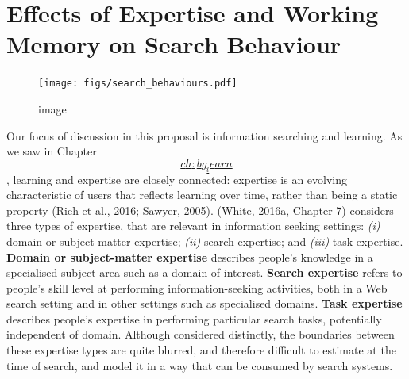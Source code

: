 \documentclass[a4paper, nobind]{templates/ociamthesis}
\begin{document}
\hypertarget{sec:bg_search_expertise}{%
\section{Effects of Expertise and Working Memory on Search Behaviour}\label{sec:bg_search_expertise}}

\begin{figure}
\centering
\texttt{[image: figs/search\_behaviours.pdf]}
\caption{image}
\end{figure}

Our focus of discussion in this proposal is information searching and
learning. As we saw in Chapter
\protect\hyperlink{ch:bg_learn}{\[ch:bg_learn\]}, learning and expertise are closely connected:
expertise is an evolving characteristic of users that reflects learning
over time, rather than being a static property
(\protect\hyperlink{ref-rieh2016searching}{Rieh et al., 2016}; \protect\hyperlink{ref-sawyer2005cambridge}{Sawyer, 2005}). (\protect\hyperlink{ref-white2016interactions}{White, 2016a, Chapter 7}) considers three types of expertise, that are relevant in
information seeking settings: \emph{(i)} domain or subject-matter expertise;
\emph{(ii)} search expertise; and \emph{(iii)} task expertise. \textbf{Domain or
subject-matter expertise} describes people's knowledge in a specialised
subject area such as a domain of interest. \textbf{Search expertise} refers
to people's skill level at performing information-seeking activities,
both in a Web search setting and in other settings such as specialised
domains. \textbf{Task expertise} describes people's expertise in performing
particular search tasks, potentially independent of domain. Although
considered distinctly, the boundaries between these expertise types are
quite blurred, and therefore difficult to estimate at the time of
search, and model it in a way that can be consumed by search systems.
\end{document}
